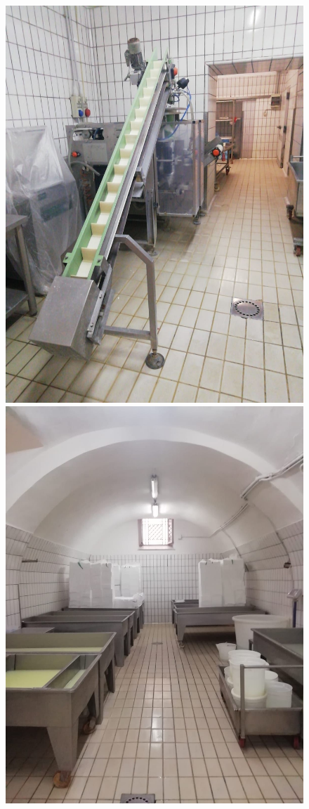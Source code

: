 \documentclass[12pt]{report}
\begin{document}
\begin{figure}[H]
\includegraphics[scale=0.10]{imgs/photos/img7.jpeg}
\includegraphics[scale=0.10]{imgs/photos/img8.jpeg}

\end{figure}
\end{document}
